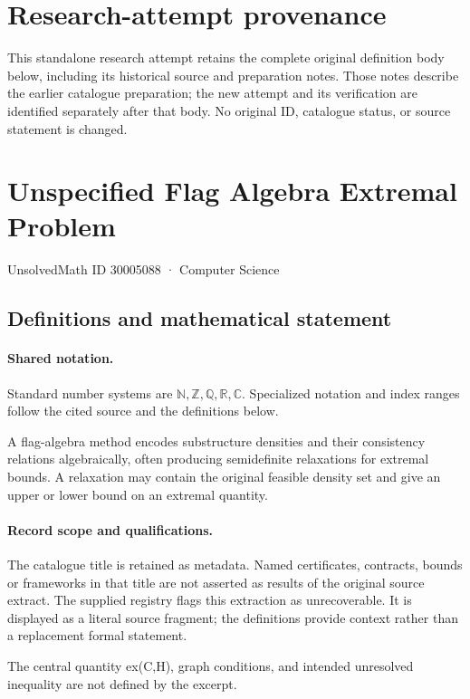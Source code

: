 \documentclass[11pt]{article}
\begin{document}
\section*{Research-attempt provenance}
This standalone research attempt retains the complete original definition body below,
including its historical source and preparation notes. Those notes describe the
earlier catalogue preparation; the new attempt and its verification are identified
separately after that body. No original ID, catalogue status, or source statement is changed.

\section{Unspecified Flag Algebra Extremal Problem}\label{30005088}
{\small UnsolvedMath ID 30005088 · Computer Science}
\subsection{Definitions and mathematical statement}

\paragraph{Shared notation.}Standard number systems are $\mathbb N,\mathbb Z,\mathbb Q,\mathbb R,\mathbb C$. Specialized notation and index ranges follow the cited source and the definitions below.


A flag-algebra method encodes substructure densities and their consistency relations algebraically, often producing semidefinite relaxations for extremal bounds. A relaxation may contain the original feasible density set and give an upper or lower bound on an extremal quantity.
\paragraph{Record scope and qualifications.}
The catalogue title is retained as metadata. Named certificates, contracts, bounds or frameworks in that title are not asserted as results of the original source extract.
The supplied registry flags this extraction as unrecoverable. It is displayed as a literal source fragment; the definitions provide context rather than a replacement formal statement.

The central quantity ex(C,H), graph conditions, and intended unresolved inequality are not defined by the excerpt.
\end{document}
